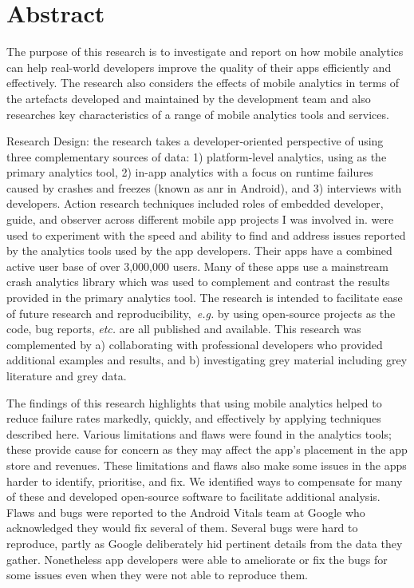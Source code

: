 \chapter*{Abstract}

The purpose of this research is to investigate and report on how mobile analytics can help
real-world developers improve the quality of their apps efficiently and effectively. The research also considers the effects of mobile analytics in terms of the artefacts developed and maintained by the development team and also researches key characteristics of a range of mobile analytics tools and services. %

Research Design: the research takes a developer-oriented perspective of using three complementary sources of data: 1) platform-level analytics, using  as the primary analytics tool, 2) in-app analytics with a focus on runtime failures caused by crashes and freezes (known as \Gls{anr} in Android), and 3) interviews with developers.
%
Action research techniques included roles of embedded developer, guide, and observer across different mobile app projects I was involved in.  were used to experiment with the speed and ability to find and address issues reported by the analytics tools used by the app developers. 
%
Their apps have a combined active user base of over 3,000,000 users. Many of these apps use a mainstream crash analytics library which was used to complement and contrast the results provided in the primary analytics tool.
%
The research is intended to facilitate ease of future research and reproducibility,~\emph{e.g.} by using  open-source projects as the code, bug reports, \emph{etc.} are all published and available. This research was complemented by a) collaborating with professional developers who provided additional examples and results, and b) investigating grey material including grey literature and grey data.

The findings of this research highlights that using mobile analytics helped to reduce failure rates markedly, quickly, and effectively by applying techniques described here.
Various limitations and flaws were found in the analytics tools; these provide cause for concern as they may affect the app's placement in the app store and revenues. These limitations and flaws also make some issues in the apps harder to identify, prioritise, and fix. We identified ways to compensate for many of these and developed open-source software to facilitate additional analysis. Flaws and bugs were reported to the Android Vitals team at Google who acknowledged they would fix several of them.
%
Several bugs were hard to reproduce, partly as Google deliberately hid pertinent details from the data they gather. Nonetheless app developers were able to ameliorate or fix the bugs for some issues even when they were not able to reproduce them. 


